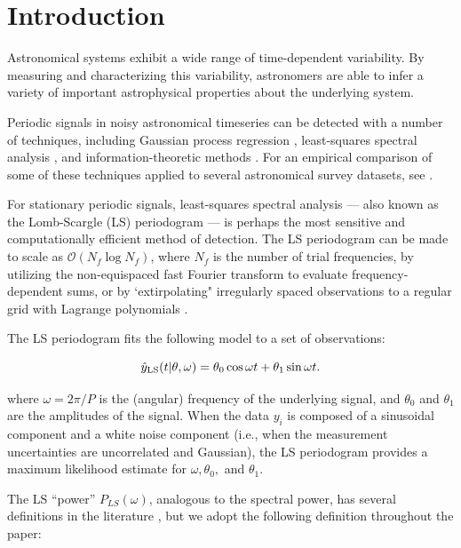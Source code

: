 \documentclass[apj]{emulateapj}
\newcommand{\bigO}{\mathcal{O}}
\begin{document}
\section{Introduction}\label{sec:introduction}

Astronomical systems exhibit a wide range of time-dependent variability. By measuring and
characterizing this variability, astronomers are able to infer a variety of important
astrophysical properties about the underlying system. 

Periodic signals in noisy astronomical timeseries can be detected with a number of techniques,
including Gaussian process regression \citep{Foreman-Mackey_etal_2017,Rasmussen+Williams_2006},
least-squares spectral analysis \citep{Lomb_1976,Scargle_1982,Barning_1963,Vanicek_1971}, and
information-theoretic methods \citep{Graham_etal_2013b,Huijse_etal_2012,Cincotta_etal_1995}. For an empirical
comparison of some of these techniques applied to several astronomical survey datasets, see
\cite{Graham_etal_2013}.

For stationary periodic signals, least-squares spectral analysis --- also known as
the Lomb-Scargle (LS) periodogram \citep{Lomb_1976,Scargle_1982,Barning_1963,Vanicek_1971} ---
is perhaps the most sensitive and computationally efficient method of detection. The LS periodogram
can be made to scale as $\bigO(N_f\log N_f)$, where $N_f$ is the number of trial frequencies, by
utilizing the non-equispaced fast Fourier transform \citep[NFFT;]{NFFT} to evaluate frequency-dependent
sums, or by `extirpolating" irregularly spaced observations to a regular grid with Lagrange polynomials \citep{Press+Rybicki_1989}. 

The LS periodogram fits the following model to a set of observations:

\begin{equation}
    \hat{y}_{\rm LS}(t|\theta, \omega) = \theta_0\cos{\omega t} + \theta_1\sin{\omega t}.
\end{equation}

where $\omega = 2\pi / P$ is the (angular) frequency of the underlying signal, and $\theta_0$ and
$\theta_1$ are the amplitudes of the signal. When the data $y_i$ is composed of a sinusoidal
component and a white noise component (i.e., when the measurement uncertainties are uncorrelated and 
Gaussian), the LS periodogram provides a maximum likelihood estimate for $\omega, \theta_0,$ and
$\theta_1$.

The LS ``power'' $P_{LS}(\omega)$, analogous to the spectral power, has several definitions 
in the literature \citep{Zechmeister+Kurster_2009}, but we adopt the following definition throughout the paper:
\end{document}
